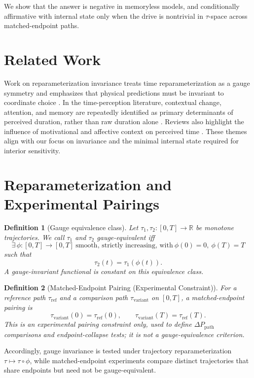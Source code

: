 \documentclass[11pt]{article}
\newtheorem{definition}{Definition}[section]
\begin{document}
We show that the answer is negative in memoryless models, and conditionally affirmative with internal state only when the drive is nontrivial in $\tau$-space across matched-endpoint paths.


\section{Related Work}

Work on reparameterization invariance treats time reparameterization as a gauge symmetry and emphasizes that physical predictions must be invariant to coordinate choice \citep{fulop1998reparam,bertschinger2002gauge,lord1971gauge}. In the time-perception literature, contextual change, attention, and memory are repeatedly identified as primary determinants of perceived duration, rather than raw duration alone \citep{block1978remembered,block2014time}. Reviews also highlight the influence of motivational and affective context on perceived time \citep{gable2022emotion}. These themes align with our focus on invariance and the minimal internal state required for interior sensitivity.

\section{Reparameterization and Experimental Pairings}

\begin{definition}[Gauge equivalence class]
Let $\tau_1,\tau_2:[0,T]\to\mathbb{R}$ be monotone trajectories. We call $\tau_1$ and $\tau_2$ gauge-equivalent iff
\[
\exists\,\phi:[0,T]\to[0,T]\ \text{smooth, strictly increasing, with}\ \phi(0)=0,\ \phi(T)=T
\]
such that
\[
\tau_2(t)=\tau_1(\phi(t)).
\]
A gauge-invariant functional is constant on this equivalence class.
\end{definition}

\begin{definition}[Matched-Endpoint Pairing (Experimental Constraint)]
For a reference path $\tau_{\mathrm{ref}}$ and a comparison path $\tau_{\mathrm{variant}}$ on $[0,T]$, a matched-endpoint pairing is
\[
\tau_{\mathrm{variant}}(0)=\tau_{\mathrm{ref}}(0),\qquad
\tau_{\mathrm{variant}}(T)=\tau_{\mathrm{ref}}(T).
\]
This is an experimental pairing constraint only, used to define $\Delta P_{\mathrm{path}}$ comparisons and endpoint-collapse tests; it is not a gauge-equivalence criterion.
\end{definition}

Accordingly, gauge invariance is tested under trajectory reparameterization $\tau\mapsto \tau\circ\phi$, while matched-endpoint experiments compare distinct trajectories that share endpoints but need not be gauge-equivalent.
\end{document}
